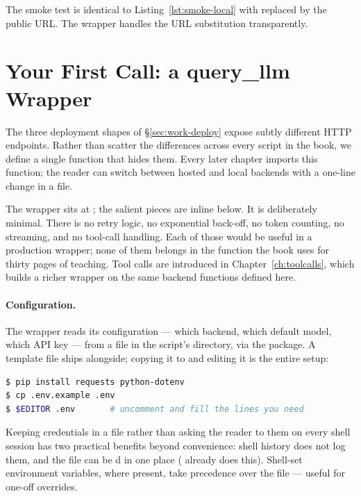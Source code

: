 \noindent
The smoke test is identical to Listing~\ref{lst:smoke-local} with
 replaced by the public URL. The
 wrapper handles the URL substitution
transparently.

\section{Your First Call: a query\_llm Wrapper}
\label{sec:work-wrapper}

The three deployment shapes of \S\ref{sec:work-deploy} expose
subtly different HTTP endpoints. Rather than scatter the
differences across every script in the book, we define a single
 function that hides them. Every later chapter
imports this function; the reader can switch between hosted and
local backends with a one-line change in a  file.

The wrapper sits at ; the
salient pieces are inline below. It is deliberately minimal. There
is no retry logic, no exponential back-off, no token counting, no
streaming, and no tool-call handling. Each of those would be
useful in a production wrapper; none of them belongs in the
function the book uses for thirty pages of teaching. Tool calls
are introduced in Chapter~\ref{ch:toolcalls}, which builds a
richer wrapper on the same backend functions defined here.

\paragraph{Configuration.}
The wrapper reads its configuration --- which backend, which
default model, which API key --- from a  file in the
script's directory, via the  package. A
template file  ships alongside; copying it to
 and editing it is the entire setup:

\begin{lstlisting}[language=bash,caption={Setting up \code{query\_llm}.},label=lst:wrapper-setup]
$ pip install requests python-dotenv
$ cp .env.example .env
$ $EDITOR .env       # uncomment and fill the lines you need
\end{lstlisting}

\noindent
Keeping credentials in a file rather than asking the reader to
 them on every shell session has two practical
benefits beyond convenience: shell history does not log them, and
the file can be d in one place
( already does this). Shell-set
environment variables, where present, take precedence over the
 file --- useful for one-off overrides.


